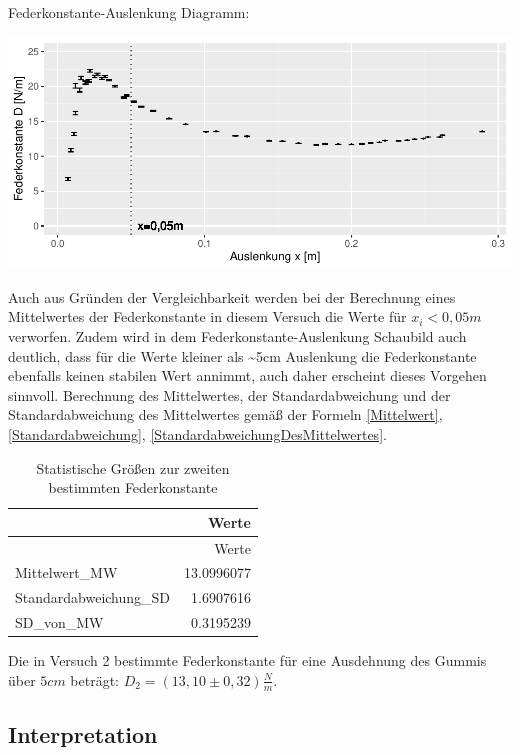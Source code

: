 \documentclass[class=article, crop=false]{standalone}
\begin{document}
Federkonstante-Auslenkung Diagramm:

\begin{center}\includegraphics{DehnbareStoffe_files/figure-latex/unnamed-chunk-15-1} \end{center}

Auch aus Gründen der Vergleichbarkeit werden bei der Berechnung eines
Mittelwertes der Federkonstante in diesem Versuch die Werte für
\(x_i<0,05m\) verworfen. Zudem wird in dem Federkonstante-Auslenkung
Schaubild auch deutlich, dass für die Werte kleiner als
\textasciitilde5cm Auslenkung die Federkonstante ebenfalls keinen
stabilen Wert annimmt, auch daher erscheint dieses Vorgehen sinnvoll.
Berechnung des Mittelwertes, der Standardabweichung und der
Standardabweichung des Mittelwertes gemäß der Formeln \ref{Mittelwert},
\ref{Standardabweichung}, \ref{StandardabweichungDesMittelwertes}.

\begin{longtable}[]{@{}lr@{}}
\caption{Statistische Größen zur zweiten bestimmten
Federkonstante}\tabularnewline
\toprule()
& Werte \\
\midrule()
\endfirsthead
\toprule()
& Werte \\
\midrule()
\endhead
Mittelwert\_MW & 13.0996077 \\
Standardabweichung\_SD & 1.6907616 \\
SD\_von\_MW & 0.3195239 \\
\bottomrule()
\end{longtable}

Die in Versuch 2 bestimmte Federkonstante für eine Ausdehnung des Gummis
über \(5cm\) beträgt: \(D_2=(13,10 \pm 0,32)\frac{N}{m}\).

\hypertarget{interpretation}{%
\subsection{Interpretation}\label{interpretation}}
\end{document}
